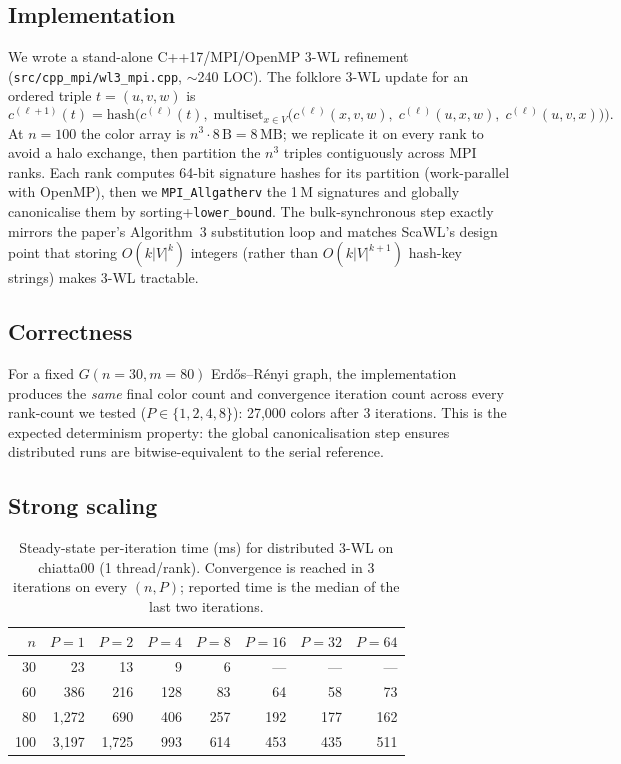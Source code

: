 \documentclass[11pt]{article}
\begin{document}
\subsection{Implementation}
We wrote a stand-alone C++17/MPI/OpenMP 3-WL refinement (\texttt{src/cpp\_mpi/wl3\_mpi.cpp}, $\sim$240 LOC). The folklore 3-WL update for an ordered triple $t=(u,v,w)$ is
\[
c^{(\ell+1)}(t) = \mathrm{hash}\Big( c^{(\ell)}(t),\; \mathrm{multiset}_{x \in V}\big( c^{(\ell)}(x,v,w),\; c^{(\ell)}(u,x,w),\; c^{(\ell)}(u,v,x) \big) \Big).
\]
At $n{=}100$ the color array is $n^3 \cdot 8\,\mathrm{B} = 8\,\mathrm{MB}$; we replicate it on every rank to avoid a halo exchange, then partition the $n^3$ triples contiguously across MPI ranks. Each rank computes 64-bit signature hashes for its partition (work-parallel with OpenMP), then we \texttt{MPI\_Allgatherv} the 1\,M signatures and globally canonicalise them by sorting+\texttt{lower\_bound}. The bulk-synchronous step exactly mirrors the paper's Algorithm~3 substitution loop and matches ScaWL's design point that storing $O(k|V|^k)$ integers (rather than $O(k|V|^{k+1})$ hash-key strings) makes 3-WL tractable.

\subsection{Correctness}
For a fixed $G(n{=}30, m{=}80)$ Erd\H{o}s--R\'enyi graph, the implementation produces the \emph{same} final color count and convergence iteration count across every rank-count we tested ($P \in \{1,2,4,8\}$): 27{,}000 colors after 3 iterations. This is the expected determinism property: the global canonicalisation step ensures distributed runs are bitwise-equivalent to the serial reference.

\subsection{Strong scaling}
\begin{table}[H]
\centering
\caption{Steady-state per-iteration time (ms) for distributed 3-WL on chiatta00 (1 thread/rank). Convergence is reached in 3 iterations on every $(n,P)$; reported time is the median of the last two iterations.}
\label{tab:wl3-strong}
\begin{tabular}{rrrrrrrr}
\toprule
$n$ & $P{=}1$ & $P{=}2$ & $P{=}4$ & $P{=}8$ & $P{=}16$ & $P{=}32$ & $P{=}64$ \\
\midrule
 30 &     23 &     13 &      9 &      6 &  ---  &  ---  &  ---  \\
 60 &    386 &    216 &    128 &     83 &     64 &     58 &     73 \\
 80 &  1{,}272 &    690 &    406 &    257 &    192 &    177 &    162 \\
100 &  3{,}197 &  1{,}725 &    993 &    614 &    453 &    435 &    511 \\
\bottomrule
\end{tabular}
\end{table}
\end{document}
